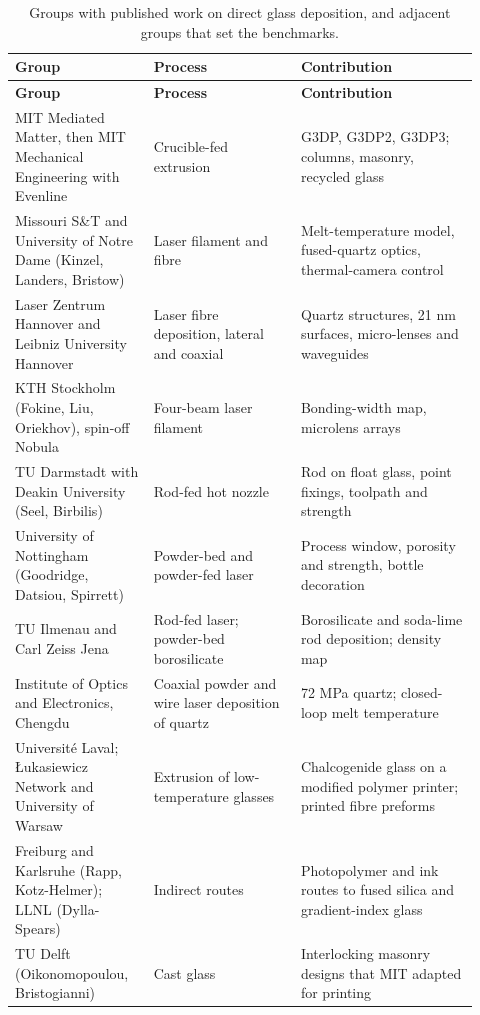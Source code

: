 \documentclass[10pt,a4paper]{article}
\begin{document}
{\footnotesize
\begin{longtable}{@{}L{0.260\linewidth}L{0.299\linewidth}L{0.357\linewidth}@{}}
  \caption{Groups with published work on direct glass deposition, and adjacent groups that set the benchmarks.}\label{tbl:groups}\\
  \toprule
  \textbf{Group} & \textbf{Process} & \textbf{Contribution} \\
  \midrule
  \endfirsthead
  \toprule
  \textbf{Group} & \textbf{Process} & \textbf{Contribution} \\
  \midrule
  \endhead
    MIT Mediated Matter, then MIT Mechanical Engineering with Evenline & Crucible-fed extrusion & G3DP, G3DP2, G3DP3; columns, masonry, recycled glass~\citep{klein2015,inamura2018,mit2024masonry} \\
    Missouri S\&T and University of Notre Dame (Kinzel, Landers, Bristow) & Laser filament and fibre & Melt-temperature model, fused-quartz optics, thermal-camera control~\citep{luo2017sodalime,luo2018quartz,dgf2026control} \\
    Laser Zentrum Hannover and Leibniz University Hannover & Laser fibre deposition, lateral and coaxial & Quartz structures, 21 nm surfaces, micro-lenses and waveguides~\citep{witzendorff2018,lgd2024homog,rettschlag2020microlens} \\
    KTH Stockholm (Fokine, Liu, Oriekhov), spin-off Nobula & Four-beam laser filament & Bonding-width map, microlens arrays~\citep{kth2022bonding,kth2024microlens} \\
    TU Darmstadt with Deakin University (Seel, Birbilis) & Rod-fed hot nozzle & Rod on float glass, point fixings, toolpath and strength~\citep{seel2018,pointfixings2024,chhadeh2026toolpath} \\
    University of Nottingham (Goodridge, Datsiou, Spirrett) & Powder-bed and powder-fed laser & Process window, porosity and strength, bottle decoration~\citep{datsiou2019,datsiou2021,spirrett2023} \\
    TU Ilmenau and Carl Zeiss Jena & Rod-fed laser; powder-bed borosilicate & Borosilicate and soda-lime rod deposition; density map~\citep{froehlich2022,boro2025laser} \\
    Institute of Optics and Electronics, Chengdu & Coaxial powder and wire laser deposition of quartz & 72 MPa quartz; closed-loop melt temperature~\citep{lang2024,lgd2025tempctrl} \\
    Université Laval; Łukasiewicz Network and University of Warsaw & Extrusion of low-temperature glasses & Chalcogenide glass on a modified polymer printer; printed fibre preforms~\citep{baudet2019,laval2023preform} \\
    Freiburg and Karlsruhe (Rapp, Kotz-Helmer); LLNL (Dylla-Spears) & Indirect routes & Photopolymer and ink routes to fused silica and gradient-index glass~\citep{kotz2017,nguyen2017,dyllaspears2020grin} \\
    TU Delft (Oikonomopoulou, Bristogianni) & Cast glass & Interlocking masonry designs that MIT adapted for printing \\
  \bottomrule
\end{longtable}
}
\end{document}
